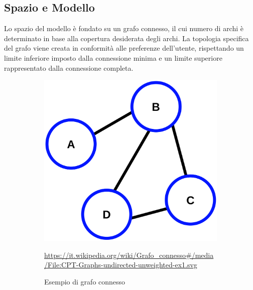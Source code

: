 \newpage

\subsection{Spazio e Modello}
Lo spazio del modello è fondato su un grafo connesso, il cui numero 
di archi è determinato in base alla copertura desiderata degli archi. 
La topologia specifica del grafo viene creata in conformità alle 
preferenze dell'utente, rispettando un limite inferiore imposto dalla 
connessione minima e un limite superiore rappresentato dalla connessione 
completa.

\begin{figure}[H]
	\centering
	\begin{subfigure}[b]{0.45\textwidth}
		\centering
		\includegraphics[width=\textwidth]{img/CPT-Graphs-undirected-unweighted-ex1.svg.png}
		\caption{Esempio di grafo connesso}
		\url{https://it.wikipedia.org/wiki/Grafo_connesso#/media/File:CPT-Graphs-undirected-unweighted-ex1.svg}
		\label{fig:connected_graph_example}
	\end{subfigure}
	\hfill
	\begin{subfigure}[b]{0.45\textwidth}
		\centering

\end{subfigure}
\end{figure}
